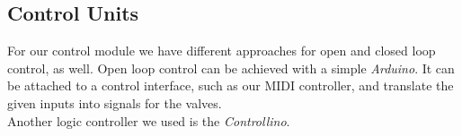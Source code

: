 \subsection{Control Units}
For our control module we have different approaches for open and closed loop control, as well. Open loop control can be achieved with a simple \textit{Arduino}. It can be attached to a control interface, such as our MIDI controller, and translate the given inputs into signals for the valves.\\
Another logic controller we used is the \textit{Controllino}.

